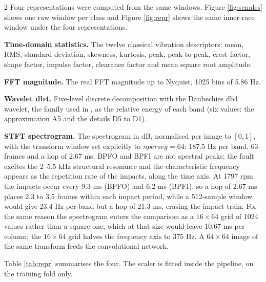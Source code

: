\documentclass[12pt,twoside,titlepage]{ingenius}
\begin{document}
\begin{multicols}{2}
Four representations were computed from the same windows. Figure
\ref{fig:senales} shows one raw window per class and Figure \ref{fig:repr} shows
the same inner-race window under the four representations.

\textbf{Time-domain statistics.} The twelve classical vibration descriptors:
mean, RMS, standard deviation, skewness, kurtosis, peak, peak-to-peak, crest
factor, shape factor, impulse factor, clearance factor and mean square root
amplitude.

\textbf{FFT magnitude.} The real FFT magnitude up to Nyquist, 1025 bins of
5.86 Hz.

\textbf{Wavelet db4.} Five-level discrete decomposition with the Daubechies db4
wavelet, the family used in \cite{gomez2023}, as the relative energy of each
band (six values: the approximation A5 and the details D5 to D1).

\textbf{STFT spectrogram.} The spectrogram in dB, normalised per image to
$[0,1]$, with the transform window set explicitly to $\mathit{nperseg} = 64$:
187.5 Hz per band, 63 frames and a hop of 2.67 ms. BPFO and BPFI are not
spectral peaks: the fault excites the 2--5.5 kHz structural resonance and the
characteristic frequency appears as the repetition rate of the impacts, along
the time axis. At 1797 rpm the impacts occur every 9.3 ms (BPFO) and 6.2 ms
(BPFI), so a hop of 2.67 ms places 2.3 to 3.5 frames within each impact period,
while a 512-sample window would give 23.4 Hz per band but a hop of 21.3 ms,
erasing the impact train. For the same reason the spectrogram enters the
comparison as a $16\times64$ grid of 1024 values rather than a square one, which
at that size would leave 10.67 ms per column; the $16\times64$ grid halves the
frequency axis to 375 Hz. A $64\times64$ image of the same transform feeds the
convolutional network.

Table \ref{tab:repr} summarises the four. The scaler is fitted inside the
pipeline, on the training fold only.

\begin{table}[H]
\centering
{}
\label{tab:repr}
\end{table}


\end{multicols}
\end{document}
